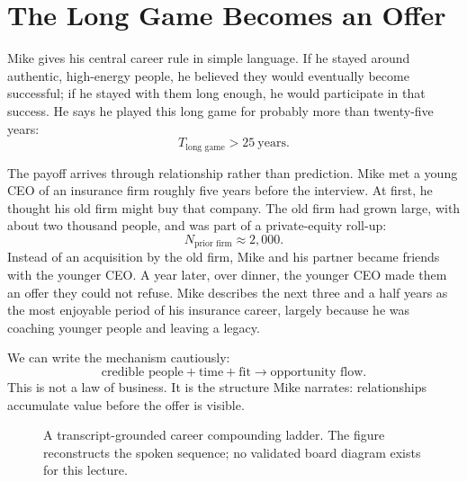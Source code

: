 \section{The Long Game Becomes an Offer}

Mike gives his central career rule in simple language. If he stayed around authentic, high-energy people, he believed they would eventually become successful; if he stayed with them long enough, he would participate in that success. He says he played this long game for probably more than twenty-five years:
\begin{equation}
T_{\text{long game}} > 25 \ \text{years}.
\end{equation}

The payoff arrives through relationship rather than prediction. Mike met a young CEO of an insurance firm roughly five years before the interview. At first, he thought his old firm might buy that company. The old firm had grown large, with about two thousand people, and was part of a private-equity roll-up:
\begin{equation}
N_{\text{prior firm}} \approx 2{,}000.
\end{equation}
Instead of an acquisition by the old firm, Mike and his partner became friends with the younger CEO. A year later, over dinner, the younger CEO made them an offer they could not refuse. Mike describes the next three and a half years as the most enjoyable period of his insurance career, largely because he was coaching younger people and leaving a legacy.

We can write the mechanism cautiously:
\begin{equation}
\text{credible people}+\text{time}+\text{fit}
\longrightarrow
\text{opportunity flow}.
\end{equation}
This is not a law of business. It is the structure Mike narrates: relationships accumulate value before the offer is visible.

\begin{figure}
\centering
{}
\caption{A transcript-grounded career compounding ladder. The figure reconstructs the spoken sequence; no validated board diagram exists for this lecture.}
\end{figure}

